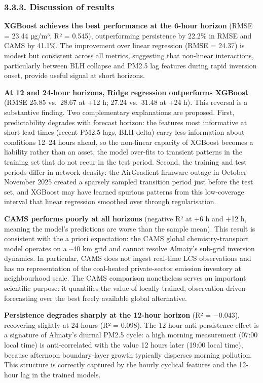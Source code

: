 \subsubsection{3.3.3. Discussion of results}\label{discussion-of-results}

\textbf{XGBoost achieves the best performance at the 6-hour horizon} (RMSE = 23.44 μg/m³, R² = 0.545), outperforming persistence by 22.2\% in RMSE and CAMS by 41.1\%. The improvement over linear regression (RMSE = 24.37) is modest but consistent across all metrics, suggesting that non-linear interactions, particularly between BLH collapse and PM2.5 lag features during rapid inversion onset, provide useful signal at short horizons.

\textbf{At 12 and 24-hour horizons, Ridge regression outperforms XGBoost} (RMSE 25.85 vs.~28.67 at +12 h; 27.24 vs.~31.48 at +24 h). This reversal is a substantive finding. Two complementary explanations are proposed. First, predictability degrades with forecast horizon: the features most informative at short lead times (recent PM2.5 lags, BLH delta) carry less information about conditions 12--24 hours ahead, so the non-linear capacity of XGBoost becomes a liability rather than an asset, the model over-fits to transient patterns in the training set that do not recur in the test period. Second, the training and test periods differ in network density: the AirGradient firmware outage in October--November 2025 created a sparsely sampled transition period just before the test set, and XGBoost may have learned spurious patterns from this low-coverage interval that linear regression smoothed over through regularisation.

\textbf{CAMS performs poorly at all horizons} (negative R² at +6 h and +12 h, meaning the model's predictions are worse than the sample mean). This result is consistent with the a priori expectation: the CAMS global chemistry-transport model operates on a \textasciitilde40 km grid and cannot resolve Almaty's sub-grid inversion dynamics. In particular, CAMS does not ingest real-time LCS observations and has no representation of the coal-heated private-sector emission inventory at neighbourhood scale. The CAMS comparison nonetheless serves an important scientific purpose: it quantifies the value of locally trained, observation-driven forecasting over the best freely available global alternative.

\textbf{Persistence degrades sharply at the 12-hour horizon} (R² = −0.043), recovering slightly at 24 hours (R² = 0.098). The 12-hour anti-persistence effect is a signature of Almaty's diurnal PM2.5 cycle: a high morning measurement (07:00 local time) is anti-correlated with the value 12 hours later (19:00 local time), because afternoon boundary-layer growth typically disperses morning pollution. This structure is correctly captured by the hourly cyclical features and the 12-hour lag in the trained models.

